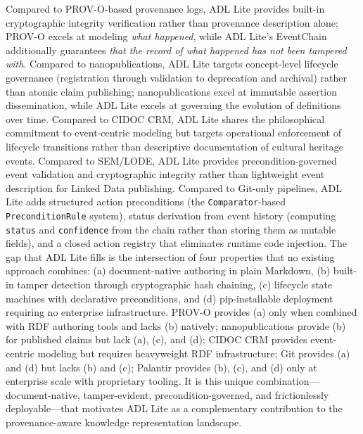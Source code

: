 Compared to PROV-O-based provenance logs, ADL Lite provides built-in cryptographic integrity verification rather than provenance description alone; PROV-O excels at modeling \emph{what happened}, while ADL Lite's EventChain additionally guarantees \emph{that the record of what happened has not been tampered with}. Compared to nanopublications, ADL Lite targets concept-level lifecycle governance (registration through validation to deprecation and archival) rather than atomic claim publishing; nanopublications excel at immutable assertion dissemination, while ADL Lite excels at governing the evolution of definitions over time. Compared to CIDOC CRM, ADL Lite shares the philosophical commitment to event-centric modeling but targets operational enforcement of lifecycle transitions rather than descriptive documentation of cultural heritage events. Compared to SEM/LODE, ADL Lite provides precondition-governed event validation and cryptographic integrity rather than lightweight event description for Linked Data publishing. Compared to Git-only pipelines, ADL Lite adds structured action preconditions (the \texttt{Comparator}-based \texttt{PreconditionRule} system), status derivation from event history (computing \texttt{status} and \texttt{confidence} from the chain rather than storing them as mutable fields), and a closed action registry that eliminates runtime code injection. The gap that ADL Lite fills is the intersection of four properties that no existing approach combines: (a) document-native authoring in plain Markdown, (b) built-in tamper detection through cryptographic hash chaining, (c) lifecycle state machines with declarative preconditions, and (d) pip-installable deployment requiring no enterprise infrastructure. PROV-O provides (a) only when combined with RDF authoring tools and lacks (b) natively; nanopublications provide (b) for published claims but lack (a), (c), and (d); CIDOC CRM provides event-centric modeling but requires heavyweight RDF infrastructure; Git provides (a) and (d) but lacks (b) and (c); Palantir provides (b), (c), and (d) only at enterprise scale with proprietary tooling. It is this unique combination---document-native, tamper-evident, precondition-governed, and frictionlessly deployable---that motivates ADL Lite as a complementary contribution to the provenance-aware knowledge representation landscape.
